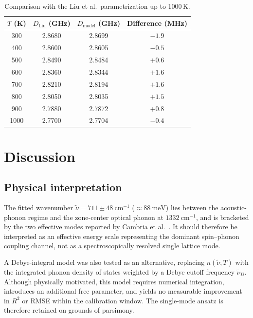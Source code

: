 \documentclass[12pt,a4paper]{article}
\begin{document}
\begin{table}[h]
\centering
\caption{Comparison with the Liu et al.\ parametrization up to 1000\,K.}
\label{tab:liu}
\begin{tabular}{cccc}
\toprule
$T$ (K) & $D_{\mathrm{Liu}}$ (GHz) & $D_{\mathrm{model}}$ (GHz) & Difference (MHz) \\
\midrule
300  & 2.8680 & 2.8699 & $-1.9$ \\
400  & 2.8600 & 2.8605 & $-0.5$ \\
500  & 2.8490 & 2.8484 & $+0.6$ \\
600  & 2.8360 & 2.8344 & $+1.6$ \\
700  & 2.8210 & 2.8194 & $+1.6$ \\
800  & 2.8050 & 2.8035 & $+1.5$ \\
900  & 2.7880 & 2.7872 & $+0.8$ \\
1000 & 2.7700 & 2.7704 & $-0.4$ \\
\bottomrule
\end{tabular}
\end{table}

\section{Discussion}

\subsection{Physical interpretation}

The fitted wavenumber $\tilde{\nu} = 711 \pm 48\ \mathrm{cm}^{-1}$
($\approx 88\ \mathrm{meV}$) lies between the acoustic-phonon regime and
the zone-center optical phonon at $1332\ \mathrm{cm}^{-1}$, and is
bracketed by the two effective modes reported by Cambria et al.\
\cite{Cambria2024}.
It should therefore be interpreted as an effective energy scale
representing the dominant spin--phonon coupling channel,
not as a spectroscopically resolved single lattice mode.

A Debye-integral model was also tested as an alternative,
replacing $n(\tilde{\nu}, T)$ with the integrated phonon density of
states weighted by a Debye cutoff frequency $\tilde{\nu}_D$.
Although physically motivated, this model requires numerical integration,
introduces an additional free parameter, and yields no measurable
improvement in $R^2$ or RMSE within the calibration window.
The single-mode ansatz is therefore retained on grounds of parsimony.
\end{document}
